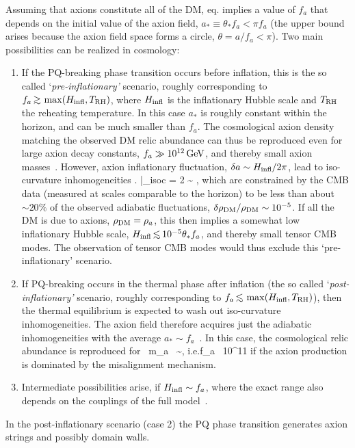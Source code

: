 Assuming that axions constitute all of the DM, eq. implies a value of $f_a$ that depends on the 
initial value of the axion field, $a_*\equiv \theta_* f_a <\pi f_a $
(the upper bound arises because the axion field space forms a circle, $\theta = a/f_a < \pi$).
Two main possibilities can be realized in cosmology:
\begin{enumerate}
\item  If the PQ-breaking phase transition occurs before inflation, this is the so called
 `{\em pre-inflationary'} scenario, roughly corresponding to $f_a \circa{>}\max(H_{\rm infl}, T_{\rm RH})$,
where $H_{\rm infl}$ is the inflationary Hubble scale and $T_{\rm RH}$ the reheating temperature. In this case
$a_*$ is roughly constant
within the horizon, and can be much smaller than $f_a$. The cosmological axion density matching the observed DM relic abundance can thus be reproduced
even for large axion decay constants, $f_a \gg 10^{12}\,{\rm GeV}$, and thereby small axion masses~\cite{axionDM}.
However, axion inflationary fluctuation, $\delta a \sim H_{\rm infl}/2\pi$,
lead to iso-curvature inhomogeneities 
\beq \left. \right|_{\rm isoc} =  2  \sim 
{} ,
\eeq
which are constrained by the CMB data (measured at scales comparable to the horizon)
to be less than about $\sim 20\%$ of the observed adiabatic fluctuations,
$\delta\rho_{\rm DM}/\rho_{\rm DM} \sim 10^{-5}$.
If all the DM is due to axions, $\rho_{\rm DM} = \rho_a$, this then implies a somewhat low inflationary Hubble scale, $H_{\rm infl} \circa{<} 10^{-5} \theta_* f_a$,
and thereby small tensor CMB modes.
The observation of tensor CMB modes would thus exclude this `pre-inflationary' scenario. 

\item If PQ-breaking occurs in the thermal phase after inflation
(the so called `{\em post-inflationary'} scenario, roughly corresponding to $f_a \circa{<}\max(H_{\rm infl}, T_{\rm RH})$), then the
thermal equilibrium is expected to wash out iso-curvature inhomogeneities.
The axion field therefore acquires just the adiabatic inhomogeneities with the average $a_* \sim f_a$~\cite{axionDM}.
In this case, the cosmological relic abundance is 
reproduced for~\cite{axionDM} 
\beq\label{eq:stdaxionmass}
m_a \,  \sim {}, \qquad \hbox{i.e.}\qquad f_a ~10^{11}\GeV
\eeq
if the axion production is dominated by the misalignment mechanism.


\item Intermediate possibilities arise, if $H_{\rm infl}\sim f_a$, where the exact range also depends on the couplings of the full model~\cite{axionDM}.


\end{enumerate}
In the post-inflationary scenario (case 2) the PQ phase transition generates axion strings and possibly
domain walls.


